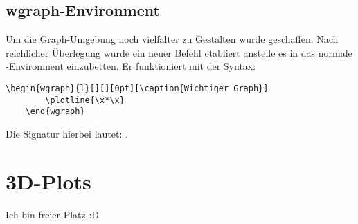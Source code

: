\subsection{wgraph-Environment}
Um die Graph-Umgebung noch vielfälter zu Gestalten wurde  geschaffen.
Nach reichlicher Überlegung wurde ein neuer Befehl etabliert anstelle es in das
normale -Environment einzubetten. Er funktioniert mit der Syntax:
\begin{lstlisting}[style=latex,frame=none,breaklines=true]
    \begin{wgraph}{l}[][][0pt][\caption{Wichtiger Graph}]
        \plotline{\x*\x}
    \end{wgraph}
\end{lstlisting}
Die Signatur hierbei lautet: .

\section{3D-Plots }
Ich bin freier Platz :D
\renewcommand{\arraystretch}{1}
